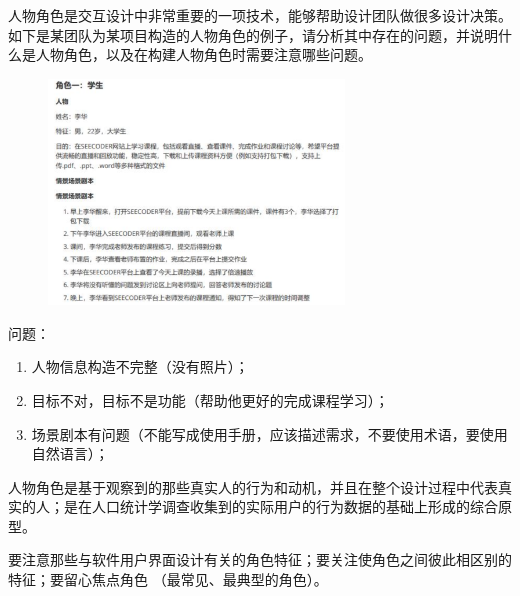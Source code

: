 \begin{problem}[2022]
人物角色是交互设计中非常重要的一项技术，能够帮助设计团队做很多设计决策。如下是某团队为某项目构造的人物角色的例子，请分析其中存在的问题，并说明什么是人物角色，以及在构建人物角色时需要注意哪些问题。
\begin{figure}[H]
    \vspace{-0.5em}
	\centering
	\includegraphics[width=0.7\textwidth]{20222.png}
    \vspace{-1em}
\end{figure}
\end{problem}

\begin{solution}
问题：
\begin{enumerate}[label=\arabic*.]
    \item 人物信息构造不完整（没有照片）；
    \item 目标不对，目标不是功能（帮助他更好的完成课程学习）；
    \item 场景剧本有问题（不能写成使用手册，应该描述需求，不要使用术语，要使用自然语言）；
\end{enumerate}

人物角色是基于观察到的那些真实人的行为和动机，并且在整个设计过程中代表真实的人；是在人口统计学调查收集到的实际用户的行为数据的基础上形成的综合原型。

要注意那些与软件用户界面设计有关的角色特征；要关注使角色之间彼此相区别的特征；要留心焦点角色 （最常见、最典型的角色）。
\end{solution}




